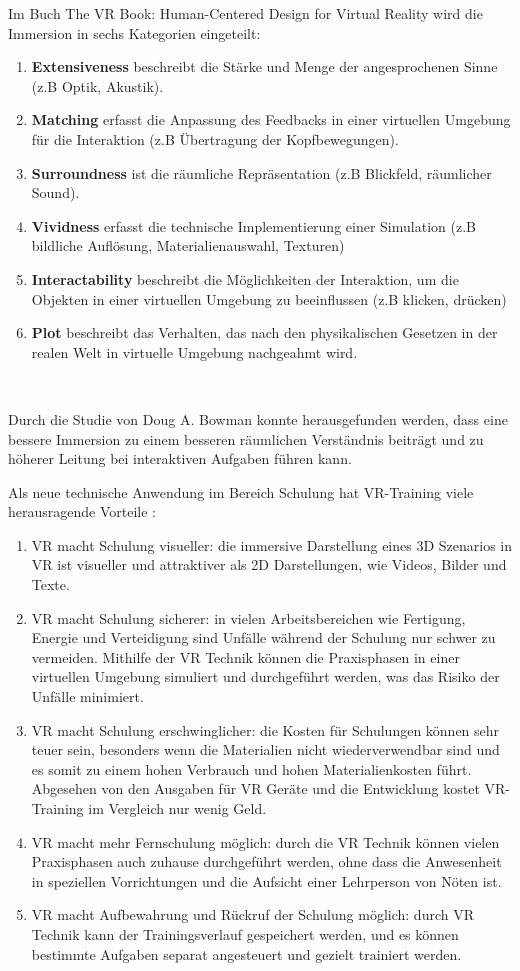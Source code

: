 Im Buch \glqq The VR Book: Human-Centered Design for Virtual Reality \grqq wird die Immersion in sechs Kategorien eingeteilt: \citep{28}

\begin{enumerate}
\item \textbf{Extensiveness} beschreibt die Stärke und Menge der angesprochenen Sinne (z.B Optik, Akustik).
\item \textbf{Matching} erfasst die Anpassung des Feedbacks in einer virtuellen Umgebung für die Interaktion (z.B Übertragung der Kopfbewegungen).
\item \textbf{Surroundness} ist die räumliche Repräsentation (z.B Blickfeld, räumlicher Sound).
\item \textbf{Vividness} erfasst die technische Implementierung einer Simulation (z.B bildliche Auflösung, Materialienauswahl, Texturen)
\item \textbf{Interactability} beschreibt die Möglichkeiten der Interaktion, um die Objekten in einer virtuellen Umgebung zu beeinflussen (z.B klicken, drücken)
\item \textbf{Plot} beschreibt das Verhalten, das nach den physikalischen Gesetzen in der realen Welt in virtuelle Umgebung nachgeahmt wird.
\end{enumerate}\

Durch die Studie von Doug A. Bowman konnte herausgefunden werden, dass eine bessere Immersion zu einem besseren räumlichen Verständnis beiträgt und zu höherer Leitung bei interaktiven Aufgaben führen kann. \citep{27}

Als neue technische Anwendung im Bereich Schulung hat VR-Training viele herausragende Vorteile \citep{15}:

\begin{enumerate}
\item VR macht Schulung visueller: die immersive Darstellung eines 3D Szenarios in VR ist visueller und attraktiver als 2D Darstellungen, wie Videos, Bilder und Texte.
\item VR macht Schulung sicherer: in vielen Arbeitsbereichen wie Fertigung, Energie und Verteidigung sind Unfälle während der Schulung nur schwer zu vermeiden. Mithilfe der VR Technik können die Praxisphasen in einer virtuellen Umgebung simuliert und durchgeführt werden, was das Risiko der Unfälle minimiert.
\item VR macht Schulung erschwinglicher: die Kosten für Schulungen können sehr teuer sein, besonders wenn die Materialien nicht wiederverwendbar sind und es somit zu einem hohen Verbrauch und hohen Materialienkosten führt. Abgesehen von den Ausgaben für VR Geräte und die Entwicklung kostet VR-Training im Vergleich nur wenig Geld.
\item VR macht mehr Fernschulung möglich: durch die VR Technik können vielen Praxisphasen auch zuhause durchgeführt werden, ohne dass die Anwesenheit in speziellen Vorrichtungen und die Aufsicht einer Lehrperson von Nöten ist.
\item VR macht Aufbewahrung und Rückruf der Schulung möglich: durch VR Technik kann der Trainingsverlauf gespeichert werden, und es können bestimmte Aufgaben separat angesteuert und gezielt trainiert werden.
\end{enumerate}\

